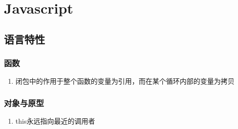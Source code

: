 \documentclass[onecolumn]{article}
\begin{document}
\section{Javascript}
    \subsection{语言特性}
        \subsubsection{函数}
            \noindent
            \begin{enumerate}
                \item 闭包中的作用于整个函数的变量为引用，而在某个循环内部的变量为拷贝
            \end{enumerate}
        \subsubsection{对象与原型}
            \noindent
            \begin{enumerate}
                \item this永远指向最近的调用者
            \end{enumerate}        
\end{document}
